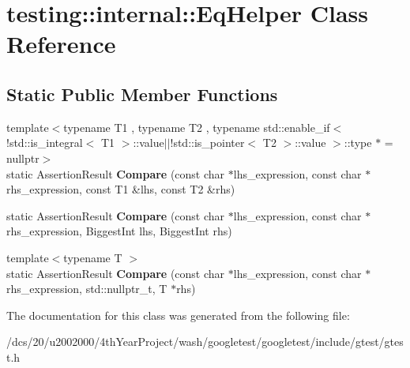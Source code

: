 \hypertarget{classtesting_1_1internal_1_1EqHelper}{}\section{testing\+:\+:internal\+:\+:Eq\+Helper Class Reference}
\label{classtesting_1_1internal_1_1EqHelper}
\subsection*{Static Public Member Functions}
\begin{DoxyCompactItemize}
\item 
\mbox{\label{classtesting_1_1internal_1_1EqHelper_aa5ee2dafddce2496d73ba13fd34bb981}} 
{\footnotesize template$<$typename T1 , typename T2 , typename std\+::enable\+\_\+if$<$!std\+::is\+\_\+integral$<$ T1 $>$\+::value$\vert$$\vert$!std\+::is\+\_\+pointer$<$ T2 $>$\+::value $>$\+::type $\ast$  = nullptr$>$ }\\static Assertion\+Result {\bfseries Compare} (const char $\ast$lhs\+\_\+expression, const char $\ast$rhs\+\_\+expression, const T1 \&lhs, const T2 \&rhs)
\item 
\mbox{\label{classtesting_1_1internal_1_1EqHelper_af7e402f6e00be1486d0f102e9f1bc931}} 
static Assertion\+Result {\bfseries Compare} (const char $\ast$lhs\+\_\+expression, const char $\ast$rhs\+\_\+expression, Biggest\+Int lhs, Biggest\+Int rhs)
\item 
\mbox{\label{classtesting_1_1internal_1_1EqHelper_af5cac2c28545dfa0688849e205f54bec}} 
{\footnotesize template$<$typename T $>$ }\\static Assertion\+Result {\bfseries Compare} (const char $\ast$lhs\+\_\+expression, const char $\ast$rhs\+\_\+expression, std\+::nullptr\+\_\+t, T $\ast$rhs)
\end{DoxyCompactItemize}


The documentation for this class was generated from the following file\+:\begin{DoxyCompactItemize}
\item 
/dcs/20/u2002000/4th\+Year\+Project/wash/googletest/googletest/include/gtest/gtest.\+h\end{DoxyCompactItemize}
